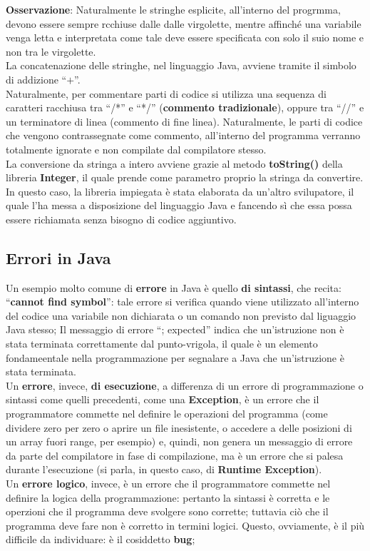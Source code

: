 \documentclass[a4paper]{extarticle}
\newcommand{\quotes}[1]{``#1''}
\begin{document}
\vspace{1em}
\noindent
\textbf{Osservazione}: Naturalmente le stringhe esplicite, all'interno del progrmma, devono essere sempre rcchiuse dalle dalle virgolette, mentre affinché una variabile venga letta e interpretata come tale deve essere specificata con solo il suio nome e non tra le virgolette.\\
La concatenazione delle stringhe, nel linguaggio Java, avviene tramite il simbolo di addizione \quotes{$+$}.\\
Naturalmente, per commentare parti di codice si utilizza una sequenza di caratteri racchiusa tra \quotes{/*} e \quotes{*/} (\textbf{commento tradizionale}), oppure tra \quotes{//} e un terminatore di linea (commento di fine linea). Naturalmente, le parti di codice che vengono contrassegnate come commento, all'interno del programma verranno totalmente ignorate e non compilate dal compilatore stesso.\\
La conversione da stringa a intero avviene grazie al metodo \textbf{toString()} della libreria \textbf{Integer}, il quale prende come parametro proprio la stringa da convertire. In questo caso, la libreria impiegata è stata elaborata da un'altro svilupatore, il quale l'ha messa a disposizione del linguaggio Java e fancendo sì che essa possa essere richiamata senza bisogno di codice aggiuntivo.

\vspace{1em}
\subsection{Errori in Java}
Un esempio molto comune di \textbf{errore} in Java è quello \textbf{di sintassi}, che recita: \quotes{\textbf{cannot find symbol}}: tale errore si verifica quando viene utilizzato all'interno del codice una variabile non dichiarata o un comando non previsto dal liguaggio Java stesso; Il messaggio di errore \quotes{; expected} indica che un'istruzione non è stata terminata correttamente dal punto-vrigola, il quale è un elemento fondameentale nella programmazione per segnalare a Java che un'istruzione è stata terminata.\\
Un \textbf{errore}, invece, \textbf{di esecuzione}, a differenza di un errore di programmazione o sintassi come quelli precedenti, come una \textbf{Exception}, è un errore che il programmatore commette nel definire le operazioni del programma (come dividere zero per zero o aprire un file inesistente, o accedere a delle posizioni di un array fuori range, per esempio) e, quindi, non genera un messaggio di errore da parte del compilatore in fase di compilazione, ma è un errore che si palesa durante l'esecuzione (si parla, in questo caso, di \textbf{Runtime Exception}).\\
Un \textbf{errore logico}, invece, è un errore che il programmatore commette nel definire la logica della programmazione: pertanto la sintassi è corretta e le operzioni che il programma deve svolgere sono corrette; tuttavia ciò che il programma deve fare non è corretto in termini logici. Questo, ovviamente, è il più difficile da individuare: è il cosiddetto \textbf{bug};
\end{document}

